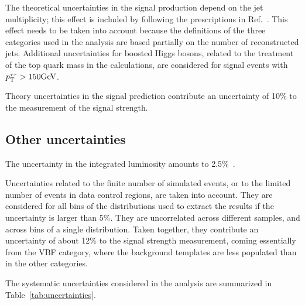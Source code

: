 The theoretical uncertainties in the signal production depend on the jet multiplicity; this effect is included 
by following the prescriptions in Ref.~\cite{Stewart:2011cf}. This effect needs to be taken into account because 
the definitions of the three categories used in the analysis are based partially on the number of reconstructed 
jets. Additional uncertainties for boosted Higgs bosons, related to the treatment of the top quark mass in 
the calculations, are considered for signal events with $p_\mathrm{T}^{\tau\tau}>150\mathrm{GeV}$.

Theory uncertainties in the signal prediction contribute an uncertainty of 10\% to the measurement of the signal strength.





\subsection{Other uncertainties}

The uncertainty in the integrated luminosity amounts to 2.5\%~\cite{CMS-PAS-LUM-17-001}.

Uncertainties related to the finite number of simulated events, or to the limited number of events in data control 
regions, are taken into account. They are considered for all bins of the distributions used to extract the results 
if the uncertainty is larger than 5\%. They are uncorrelated across different samples, and across bins of a single 
distribution. Taken together, they contribute an uncertainty of about 12\% to the signal strength measurement, 
coming essentially from the VBF category, where the background templates are less
populated than in the other categories.

The systematic uncertainties considered in the analysis are summarized in Table~\ref{tab:uncertainties}.


